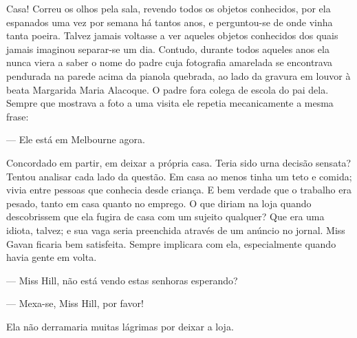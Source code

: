 Casa! Correu os olhos pela sala, revendo todos os objetos conhecidos,
por ela espanados uma vez por semana há tantos anos, e perguntou-se de
onde vinha tanta poeira. Talvez jamais voltasse a ver aqueles objetos
conhecidos dos quais jamais imaginou separar-se um dia. Contudo,
durante todos aqueles anos ela nunca viera a saber o nome do padre
cuja fotografia amarelada se encontrava pendurada na parede acima da
pianola quebrada, ao lado da gravura em louvor à beata Margarida Maria
Alacoque. O padre fora colega de escola do pai dela. Sempre que
mostrava a foto a uma visita ele repetia mecanicamente a mesma frase:

--- Ele está em Melbourne agora.

Concordado em partir, em deixar a própria casa. Teria sido urna
decisão sensata? Tentou analisar cada lado da questão. Em casa ao
menos tinha um teto e comida; vivia entre pessoas que conhecia desde
criança. E bem verdade que o trabalho era pesado, tanto em casa quanto
no emprego. O que diriam na loja quando descobrissem que ela fugira de
casa com um sujeito qualquer? Que era uma idiota, talvez; e sua vaga
seria preenchida através de um anúncio no jornal. Miss Gavan ficaria
bem satisfeita. Sempre implicara com ela, especialmente quando havia
gente em volta.

--- Miss Hill, não está vendo estas senhoras esperando?

--- Mexa-se, Miss Hill, por favor!

Ela não derramaria muitas lágrimas por deixar a loja.

